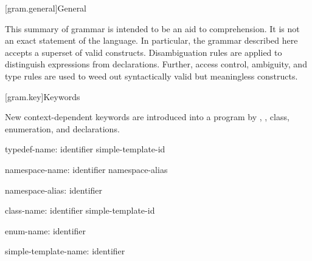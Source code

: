
[gram.general]{General}

\pnum
{}%
%
This summary of \Cpp{} grammar is intended to be an aid to comprehension.
It is not an exact statement of the language.
In particular, the grammar described here accepts
a superset of valid \Cpp{} constructs.
Disambiguation rules
are applied to distinguish expressions from declarations.
Further, access control, ambiguity, and type rules are used
to weed out syntactically valid but meaningless constructs.

[gram.key]{Keywords}

\pnum
{}%
New context-dependent keywords are introduced into a program by
,
,
class, enumeration, and
declarations.

\begin{ncbnf}
typedef-name:\br
    identifier\br
    simple-template-id
\end{ncbnf}

\begin{ncbnf}
namespace-name:\br
    identifier\br
    namespace-alias
\end{ncbnf}

\begin{ncbnf}
namespace-alias:\br
    identifier
\end{ncbnf}

\begin{ncbnf}
class-name:\br
    identifier\br
    simple-template-id
\end{ncbnf}

\begin{ncbnf}
enum-name:\br
    identifier
\end{ncbnf}

\begin{ncbnf}
simple-template-name:\br
    identifier
\end{ncbnf}


